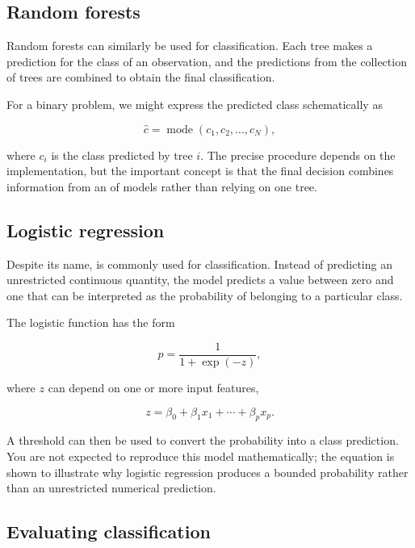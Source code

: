 \subsection{Random forests}

Random forests can similarly be used for classification.
Each tree makes a prediction for the class of an observation, and the predictions from the collection of trees are combined to obtain the final classification.

For a binary problem, we might express the predicted class schematically as

\begin{equation}
  \hat{c} = \operatorname{mode} \left( c_1,c_2,\ldots,c_N \right),
\end{equation}

where \(c_i\) is the class predicted by tree \(i\).
The precise procedure depends on the implementation, but the important concept is that the final decision combines information from an  of models rather than relying on one tree.

\subsection{Logistic regression}

Despite its name,  is commonly used for classification.
Instead of predicting an unrestricted continuous quantity, the model predicts a value between zero and one that can be interpreted as the probability of belonging to a particular class.

The logistic function has the form

\begin{equation}
  p = \frac{1}
    {1 + \exp(-z)},
\end{equation}

where \(z\) can depend on one or more input features,

\begin{equation}
  z = β_0 + β_1x_1 + \cdots + β_px_p.
\end{equation}

A threshold can then be used to convert the probability into a class prediction.
You are not expected to reproduce this model mathematically; the equation is shown to illustrate why logistic regression produces a bounded probability rather than an unrestricted numerical prediction.

\subsection{Evaluating classification}

